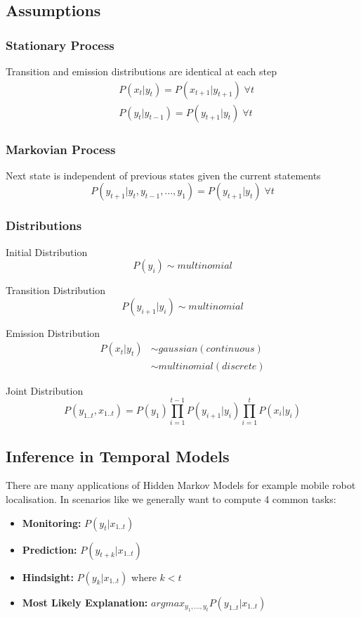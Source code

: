 \documentclass[12pt]{article}
\begin{document}
    \subsection{Assumptions} 
        \subsubsection{Stationary Process}
            Transition and emission distributions are identical at each step
            \begin{align*}
                & P(x_t|y_t) = P(x_{t+1}|y_{t+1}) \; \forall t \\
                & P(y_t|y_{t-1}) = P(y_{t+1}|y_{t}) \; \forall t
            \end{align*}
        
        \subsubsection{Markovian Process}
            Next state is independent of previous states given the current statements
            $$ P(y_{t+1}|y_{t}, y_{t-1},...,y_{1}) = P(y_{t+1}|y_{t}) \; \forall t $$
        
        \subsubsection{Distributions}
            Initial Distribution
            $$ P(y_i) \sim multinomial $$

            Transition Distribution
            $$ P(y_{i+1}|y_{i}) \sim multinomial $$

            Emission Distribution
            \begin{align*}
                P(x_{t} | y_{t}) & \sim gaussian (continuous) \\
                & \sim multinomial (discrete)
            \end{align*}

            Joint Distribution
            $$ P(y_{1 .. t}, x_{1 .. t}) = P(y_{1})\prod_{i=1}^{t-1} P(y_{i+1}|y_{i}) \prod_{i=1}^{t} P(x_{i}|y_{i})
            $$
            
    \subsection{Inference in Temporal Models}
        There are many applications of Hidden Markov Models for example mobile robot localisation. 
        In scenarios like we generally want to compute 4 common tasks:
        \begin{itemize}
            \item \textbf{Monitoring: } $P(y_t|x_{1..t})$
            \item \textbf{Prediction: } $P(y_{t+k} | x_{1..t}) $
            \item \textbf{Hindsight: } $P(y_k | x_{1..t})$ where $k < t$
            \item \textbf{Most Likely Explanation: } $argmax_{y_1,...,y_t} P(y_{1..t}|x_{1..t})$
        \end{itemize}
        
\end{document}
